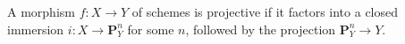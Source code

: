 A morphism $f: X \to Y$ of schemes is projective if it factors into a closed immersion $i: X \to \mathbf{P}_Y^n$ for some $n$, followed by the projection $\mathbf{P}_Y^n \to Y$.
